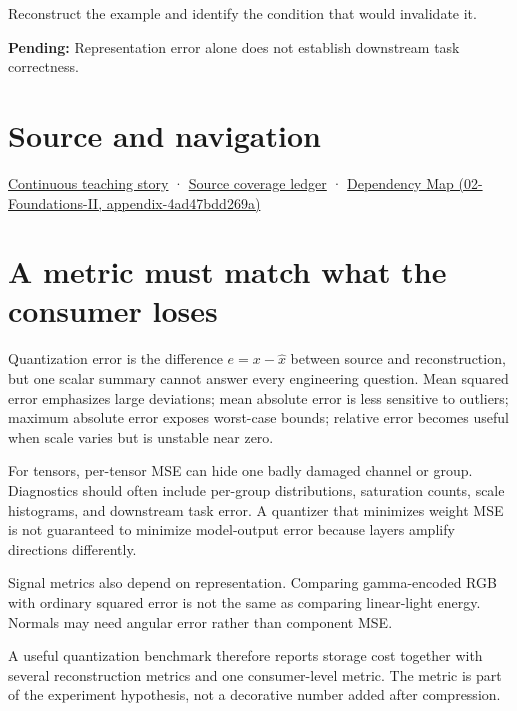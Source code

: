 Reconstruct the example and identify the condition that would invalidate it.

\textbf{Pending:} Representation error alone does not establish downstream task correctness.

\section{Source and navigation}\label{appendix-537171d69d27-source-and-navigation}

\href{Continuous\%20Notes/Computing\%20Foundations\%20-\%20From\%20Bits\%20to\%20C++\%20and\%20Systems\%20APIs\#Choosing\%20what\%20information\%20to\%20keep}{Continuous teaching story} · \hyperref[appendix-fd090d982a15]{Source coverage ledger} · \href{../02-Foundations-II/main.pdf\#nameddest=appendix-4ad47bdd269a}{Dependency Map (02-Foundations-II, appendix-4ad47bdd269a)}

\section{A metric must match what the consumer loses}\label{appendix-537171d69d27-a-metric-must-match-what-the-consumer-loses}

Quantization error is the difference \(e=x-\hat x\) between source and reconstruction, but one scalar summary cannot answer every engineering question. Mean squared error emphasizes large deviations; mean absolute error is less sensitive to outliers; maximum absolute error exposes worst-case bounds; relative error becomes useful when scale varies but is unstable near zero.

For tensors, per-tensor MSE can hide one badly damaged channel or group. Diagnostics should often include per-group distributions, saturation counts, scale histograms, and downstream task error. A quantizer that minimizes weight MSE is not guaranteed to minimize model-output error because layers amplify directions differently.

Signal metrics also depend on representation. Comparing gamma-encoded RGB with ordinary squared error is not the same as comparing linear-light energy. Normals may need angular error rather than component MSE.

A useful quantization benchmark therefore reports storage cost together with several reconstruction metrics and one consumer-level metric. The metric is part of the experiment hypothesis, not a decorative number added after compression.

